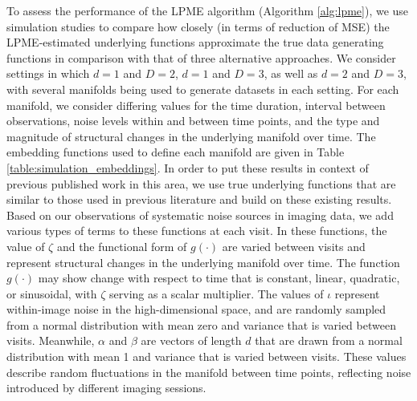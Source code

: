 \documentclass[12pt]{article}
\theoremstyle{definition}
\begin{document}
To assess the performance of the LPME algorithm (Algorithm \ref{alg:lpme}), we use simulation studies to compare how closely (in terms of reduction of MSE) the LPME-estimated underlying functions approximate the true data generating functions in comparison with that of three alternative approaches. We consider settings in which $d = 1$ and $D = 2$, $d = 1$ and $D = 3$, as well as $d = 2$ and $D = 3$, with several manifolds being used to generate datasets in each setting. For each manifold, we consider differing values for the time duration, interval between observations, noise levels within and between time points, and the type and magnitude of structural changes in the underlying manifold over time. The embedding functions used to define each manifold are given in Table \ref{table:simulation_embeddings}. In order to put these results in context of previous published work in this area, we use true underlying functions that are similar to those used in previous literature and build on these existing results. Based on our observations of systematic noise sources in imaging data, we add various types of terms to these functions at each visit. In these functions, the value of $\zeta$ and the functional form of $g(\cdot)$ are varied between visits and represent structural changes in the underlying manifold over time. The function $g(\cdot)$ may show change with respect to time that is constant, linear, quadratic, or sinusoidal, with $\zeta$ serving as a scalar multiplier. The values of $\iota$ represent within-image noise in the high-dimensional space, and are randomly sampled from a normal distribution with mean zero and variance that is varied between visits. Meanwhile, $\alpha$ and $\beta$ are vectors of length $d$ that are drawn from a normal distribution with mean 1 and variance that is varied between visits. These values describe random fluctuations in the manifold between time points, reflecting noise introduced by different imaging sessions.
\end{document}
